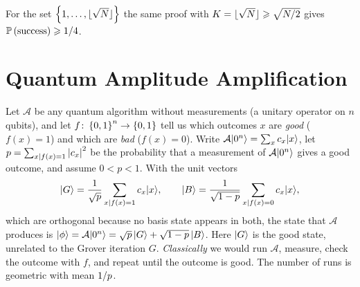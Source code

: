 For the set $\set{1, \dots, \floor{\sqrt{N}}}$ the same proof with
$K = \floor{\sqrt{N}} \geq \sqrt{\sfrac{N}{2}}$ gives $\operatorname{\mathbb{P}}\left(\text{success}\right) \geqslant 1/4$.

\section{Quantum Amplitude Amplification}\label{sec:ampamp-1008}

Let $\mathcal{A}$ be any quantum algorithm without measurements (a unitary operator on $n$
qubits), and let $f \colon \left\lbrace0,1\right\rbrace^n \to \left\lbrace0,1\right\rbrace$ tell us which outcomes $x$ are \emph{good}
($f(x) = 1$) and which are \emph{bad} ($f(x) = 0$). Write
$\mathcal{A}\lvert 0^n \rangle = \sum_x c_x \lvert x \rangle$, let
$p = \sum_{x \mid f(x) = 1} \left\lvert c_x\right\rvert^2$ be the probability that a measurement of
$\mathcal{A}\lvert 0^n \rangle$ gives a good outcome, and assume $0 < p < 1$. With the unit vectors
\[\lvert G \rangle = \frac{1}{\sqrt{p}} \sum_{x \mid f(x) = 1} c_x \lvert x \rangle,
    \qquad
    \lvert B \rangle = \frac{1}{\sqrt{1-p}} \sum_{x \mid f(x) = 0} c_x \lvert x \rangle,\]
which are orthogonal because no basis state appears in both, the state that $\mathcal{A}$ produces is
$\lvert \phi \rangle = \mathcal{A}\lvert 0^n \rangle = \sqrt{p}\, \lvert G \rangle + \sqrt{1-p}\, \lvert B \rangle$. Here $\lvert G \rangle$ is
the good state, unrelated to the Grover iteration $G$.
\emph{Classically} we would run $\mathcal{A}$, measure, check the outcome with $f$, and repeat until
the outcome is good. The number of runs is geometric with mean $1/p$.


